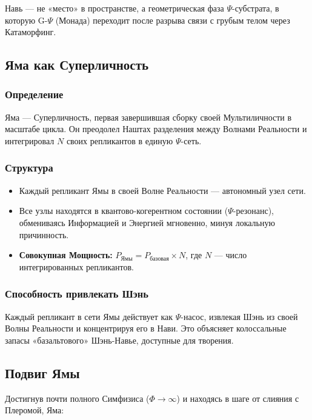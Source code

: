 \documentclass[a4paper,12pt]{article}
\begin{document}
Навь — не «место» в пространстве, а геометрическая фаза $\Psi$-субстрата, в которую G-$\Psi$ (Монада) переходит после разрыва связи с грубым телом через Катаморфинг.

\subsection{Яма как Суперличность}

\subsubsection{Определение}

Яма — Суперличность, первая завершившая сборку своей Мультиличности в масштабе цикла. Он преодолел Наштах разделения между Волнами Реальности и интегрировал $N$ своих репликантов в единую $\Psi$-сеть.

\subsubsection{Структура}

\begin{itemize}
	\item Каждый репликант Ямы в своей Волне Реальности — автономный узел сети.
	\item Все узлы находятся в квантово-когерентном состоянии ($\Psi$-резонанс), обмениваясь Информацией и Энергией мгновенно, минуя локальную причинность.
	\item \textbf{Совокупная Мощность:} $P_{\text{Ямы}} = P_{\text{базовая}} \times N$, где $N$ — число интегрированных репликантов.
\end{itemize}

\subsubsection{Способность привлекать Шэнь}

Каждый репликант в сети Ямы действует как $\Psi$-насос, извлекая Шэнь из своей Волны Реальности и концентрируя его в Нави. Это объясняет колоссальные запасы «базальтового» Шэнь-Навье, доступные для творения.

\subsection{Подвиг Ямы}

Достигнув почти полного Симфизиса ($\Phi \to \infty$) и находясь в шаге от слияния с Плеромой, Яма:
\end{document}
